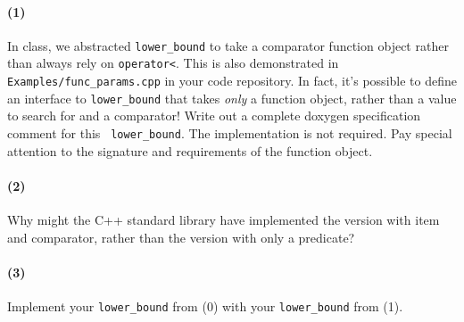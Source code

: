 \documentclass[12pt,letterpaper,twoside]{article}
\begin{document}
\paragraph{(1)} In class, we abstracted {\tt lower\_bound} to take a comparator
function object rather than always rely on {\tt operator<}. This is also
demonstrated in {\tt Examples/func\_params.cpp} in your code repository. In
fact, it's possible to define an interface to {\tt lower\_bound} that takes
\emph{only} a function object, rather than a value to search for and a comparator!
Write out a complete doxygen specification comment for this {\tt
  lower\_bound}. The implementation is not required. Pay special attention to
the signature and requirements of the function object.


\paragraph{(2)} Why might the C++ standard library have implemented the version with item and comparator, rather than the version with only a predicate?


\paragraph{(3)} Implement your {\tt lower\_bound} from (0) with your {\tt lower\_bound} from (1).
\end{document}
